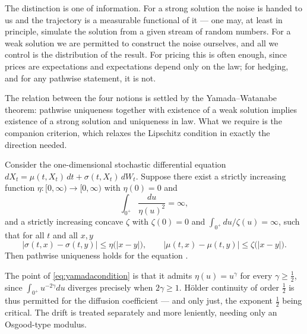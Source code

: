 The distinction is one of information. For a strong solution the noise is handed to us and the 
trajectory is a measurable functional of it --- one may, at least in principle, simulate the 
solution from a given stream of random numbers. For a weak solution we are permitted to construct 
the noise ourselves, and all we control is the distribution of the result. For pricing this is often 
enough, since prices are expectations and expectations depend only on the law; for hedging, and for 
any pathwise statement, it is not.

The relation between the four notions is settled by the Yamada--Watanabe theorem: pathwise 
uniqueness together with existence of a weak solution implies existence of a strong solution and 
uniqueness in law. What we require is the companion criterion, which relaxes the Lipschitz condition 
in exactly the direction needed.

\begin{theorem}\label{thm:yamadawatanabe}
Consider the one-dimensional stochastic differential equation $dX_t = \mu(t,X_t)\,dt + \sigma(t,X_t)\,dW_t$. Suppose there
exist a strictly increasing function $\eta:[0,\infty)\to[0,\infty)$ with $\eta(0)=0$ and
\begin{equation}\label{eq:yamadacondition}
\int_{0^+} \frac{du}{\eta(u)^2} = \infty,
\end{equation}
and a strictly increasing concave $\zeta$ with $\zeta(0)=0$ and $\int_{0^+}du/\zeta(u)=\infty$,
such that for all $t$ and all $x,y$
\[
\bigl|\sigma(t,x)-\sigma(t,y)\bigr| \leq \eta\bigl(|x-y|\bigr), \qquad
\bigl|\mu(t,x)-\mu(t,y)\bigr| \leq \zeta\bigl(|x-y|\bigr).
\]
Then pathwise uniqueness holds for the equation \cite{yamada1971}. \qedopentext
\end{theorem}


The point of \eqref{eq:yamadacondition} is that it admits $\eta(u) = u^{\gamma}$ for every
$\gamma \geq \tfrac12$, since $\int_{0^+} u^{-2\gamma}du$ diverges precisely when
$2\gamma \geq 1$. Hölder continuity of order $\tfrac12$ is thus permitted for the diffusion 
coefficient --- and only just, the exponent $\tfrac12$ being critical. The drift is treated 
separately and more leniently, needing only an Osgood-type modulus.

